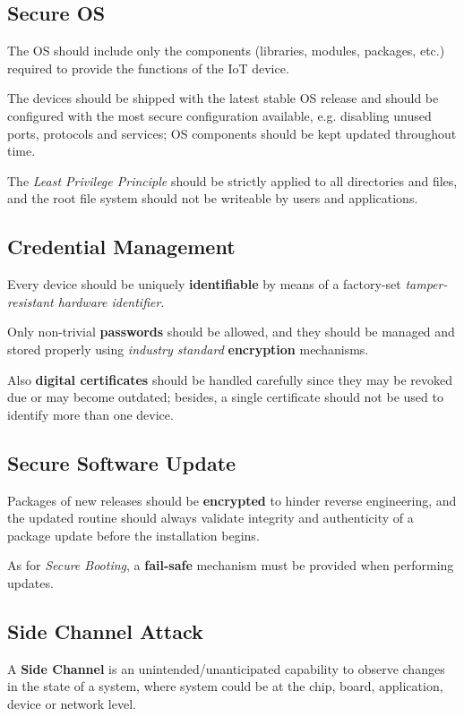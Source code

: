 
\subsection{Secure OS}
The OS should include only the components (libraries, modules, packages, etc.) required to provide the functions of the IoT device.

The devices should be shipped with the latest stable OS release and should be configured with the most secure configuration available, e.g. disabling unused ports, protocols and services;
OS components should be kept updated throughout time.

The \textit{Least Privilege Principle} should be strictly applied to all directories and files, and the root file system should not be writeable by users and applications.

\subsection{Credential Management}
Every device should be uniquely \textbf{identifiable} by means of a factory-set \textit{tamper-resistant hardware identifier}.

Only non-trivial \textbf{passwords} should be allowed, and they should be managed and stored properly using \textit{industry standard} \textbf{encryption} mechanisms.

Also \textbf{digital certificates} should be handled carefully since they may be revoked due or may become outdated; besides, a single certificate should not be used to identify more than one device.

\subsection{Secure Software Update}
Packages of new releases should be \textbf{encrypted} to hinder reverse engineering, and the
updated routine should always validate integrity and authenticity of a package update before the installation begins.

As for \textit{Secure Booting}, a \textbf{fail-safe} mechanism must be provided when performing updates.

\subsection{Side Channel Attack}
A \textbf{Side Channel} is an unintended/unanticipated capability to observe changes in the state
of a system, where system could be at the chip, board, application, device or network
level.

